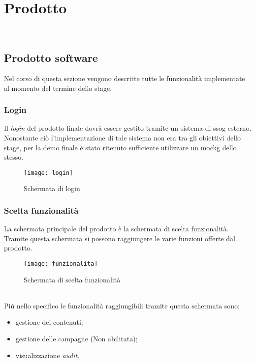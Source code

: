 
\chapter{Prodotto}
\label{cap:prodotto}

\\

\section{Prodotto software}
Nel corso di questa sezione vengono descritte tutte le funzionalità implementate al momento del termine dello stage.

\subsection{Login}
Il \textit{login} del prodotto finale dovrà essere gestito tramite un sistema di \gls{ssog} esterno. Nonostante ciò l'implementazione di tale sistema non era tra gli obiettivi dello stage, per la demo finale è stato ritenuto sufficiente utilizzare un \gls{mockg} dello stesso. 
\begin{figure}[h]
    \begin{center}
    \texttt{[image: login]}
    \caption{Schermata di login}
    \label{fig:figure20}
    \end{center}
\end{figure}

\subsection{Scelta funzionalità}
La schermata principale del prodotto è la schermata di scelta funzionalità. Tramite questa schermata si possono raggiungere le varie funzioni offerte dal prodotto.
\begin{figure}[h]
    \begin{center}
    \texttt{[image: funzionalita]}
    \caption{Schermata di scelta funzionalità}
    \label{fig:figure21}
    \end{center}
\end{figure}
\\Più nello specifico le funzionalità raggiungibili tramite questa schermata sono:
\begin{itemize}
    \item gestione dei contenuti;
    \item gestione delle campagne (Non abilitata);
    \item visualizzazione \textit{audit}.
\end{itemize}

